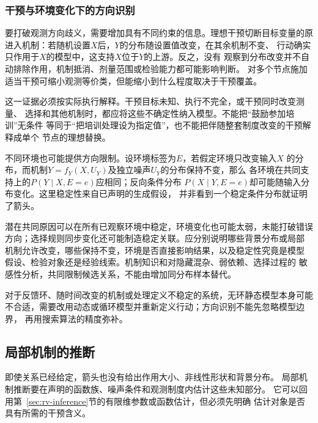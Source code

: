 \subsubsection{干预与环境变化下的方向识别}
\label{sec:causal-interventional-structure}

要打破观测方向歧义，需要增加具有不同约束的信息。理想干预切断目标变量的原
进入机制：若随机设置\(X\)后，\(Y\)的分布随设置值改变，在其余机制不变、
行动确实只作用于\(X\)的模型中，这支持\(X\)位于\(Y\)的上游。反之，没有
观察到分布改变并不自动排除作用，机制抵消、剂量范围或检验能力都可能影响判断。
对多个节点施加适当干预可缩小观测等价类，但能缩小到什么程度取决于干预覆盖。

这一证据必须按实际执行解释。干预目标未知、执行不完全，或干预同时改变测量、
选择和其他机制时，都应将这些不确定性纳入模型。不能把“鼓励参加培训”无条件
等同于“把培训处理设为指定值”，也不能把伴随整套制度改变的干预解释成单个
节点的理想替换。

不同环境也可能提供方向限制。设环境标签为\(E\)，若假定环境只改变输入\(X\)
的分布，而机制\(Y=f_Y(X,U_Y)\)及独立噪声\(U_Y\)的分布保持不变，那么
各环境在共同支持上的\(P(Y\mid X,E=e)\)应相同；反向条件分布
\(P(X\mid Y,E=e)\)却可能随输入分布变化。这里稳定性来自已声明的生成假设，
并非看到一个稳定条件分布就证明了箭头。

潜在共同原因可以在所有已观察环境中稳定，环境变化也可能太弱，未能打破错误
方向；选择规则同步变化还可能制造稳定关联。应分别说明哪些背景分布或局部
机制允许改变，哪些保持不变，环境是否直接影响结果，以及稳定性究竟是模型
假设、检验对象还是经验线索。机制知识和对隐藏混杂、弱依赖、选择过程的
敏感性分析，共同限制候选关系，不能由增加同分布样本替代。

对于反馈环、随时间改变的机制或处理定义不稳定的系统，无环静态模型本身可能
不合适，需要改用动态或循环模型并重新定义行动；方向识别不能先忽略模型边界，
再用搜索算法的精度弥补。

\subsection{局部机制的推断}
\label{sec:causal-local-mechanism-inference}

即使关系已经给定，箭头也没有给出作用大小、非线性形状和背景分布。
局部机制推断要在声明的函数族、噪声条件和观测制度内估计这些未知部分。
它可以回用第~\ref{sec:rv-inference}节的有限维参数或函数估计，但必须先明确
估计对象是否具有所需的干预含义。

